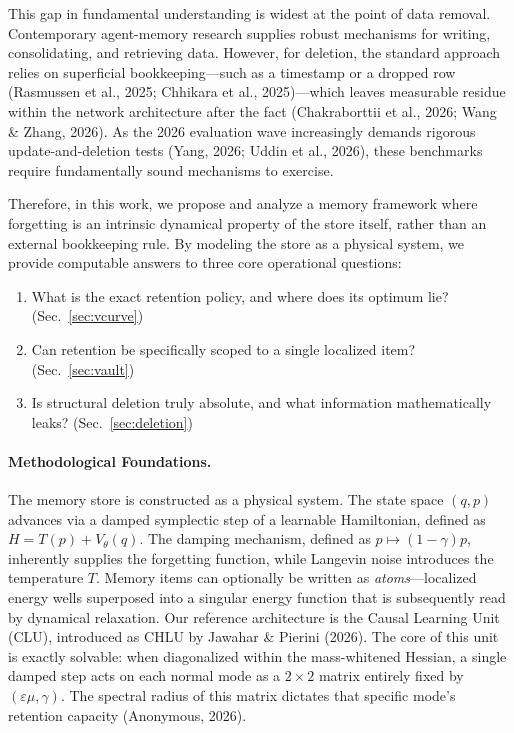 \documentclass{article}
\begin{document}
This gap in fundamental understanding is widest at the point of data removal. Contemporary agent-memory research supplies robust mechanisms for writing, consolidating, and retrieving data. However, for deletion, the standard approach relies on superficial bookkeeping---such as a timestamp or a dropped row (Rasmussen et al., 2025; Chhikara et al., 2025)---which leaves measurable residue within the network architecture after the fact (Chakraborttii et al., 2026; Wang \& Zhang, 2026). As the 2026 evaluation wave increasingly demands rigorous update-and-deletion tests (Yang, 2026; Uddin et al., 2026), these benchmarks require fundamentally sound mechanisms to exercise.

Therefore, in this work, we propose and analyze a memory framework where forgetting is an intrinsic dynamical property of the store itself, rather than an external bookkeeping rule. By modeling the store as a physical system, we provide computable answers to three core operational questions:
\begin{enumerate}
    \item What is the exact retention policy, and where does its optimum lie? (Sec.~\ref{sec:vcurve})
    \item Can retention be specifically scoped to a single localized item? (Sec.~\ref{sec:vault})
    \item Is structural deletion truly absolute, and what information mathematically leaks? (Sec.~\ref{sec:deletion})
\end{enumerate}

\paragraph{Methodological Foundations.}
The memory store is constructed as a physical system. The state space $(q,p)$ advances via a damped symplectic step of a learnable Hamiltonian, defined as $H=T(p)+V_\theta(q)$. The damping mechanism, defined as $p\mapsto(1-\gamma)p$, inherently supplies the forgetting function, while Langevin noise introduces the temperature $T$. Memory items can optionally be written as \emph{atoms}---localized energy wells superposed into a singular energy function that is subsequently read by dynamical relaxation. Our reference architecture is the Causal Learning Unit (CLU), introduced as CHLU by Jawahar \& Pierini (2026). The core of this unit is exactly solvable: when diagonalized within the mass-whitened Hessian, a single damped step acts on each normal mode as a $2\times2$ matrix entirely fixed by $(\varepsilon\mu,\gamma)$. The spectral radius of this matrix dictates that specific mode's retention capacity (Anonymous, 2026).
\end{document}
